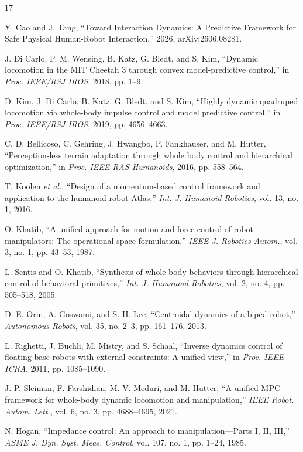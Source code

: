 \documentclass[journal]{IEEEtran}
\theoremstyle{plain}
\theoremstyle{definition}
\theoremstyle{remark}
\begin{document}
\begin{thebibliography}{17}

 Y. Cao and J. Tang, ``Toward Interaction Dynamics: A Predictive Framework for Safe Physical Human-Robot Interaction,'' 2026, arXiv:2606.08281.

 J. Di Carlo, P. M. Wensing, B. Katz, G. Bledt, and S. Kim, ``Dynamic locomotion in the MIT Cheetah 3 through convex model-predictive control,'' in \emph{Proc. IEEE/RSJ IROS}, 2018, pp. 1--9.

 D. Kim, J. Di Carlo, B. Katz, G. Bledt, and S. Kim, ``Highly dynamic quadruped locomotion via whole-body impulse control and model predictive control,'' in \emph{Proc. IEEE/RSJ IROS}, 2019, pp. 4656--4663.

 C. D. Bellicoso, C. Gehring, J. Hwangbo, P. Fankhauser, and M. Hutter, ``Perception-less terrain adaptation through whole body control and hierarchical optimization,'' in \emph{Proc. IEEE-RAS Humanoids}, 2016, pp. 558--564.

 T. Koolen \emph{et al.}, ``Design of a momentum-based control framework and application to the humanoid robot Atlas,'' \emph{Int. J. Humanoid Robotics}, vol. 13, no. 1, 2016.

 O. Khatib, ``A unified approach for motion and force control of robot manipulators: The operational space formulation,'' \emph{IEEE J. Robotics Autom.}, vol. 3, no. 1, pp. 43--53, 1987.

 L. Sentis and O. Khatib, ``Synthesis of whole-body behaviors through hierarchical control of behavioral primitives,'' \emph{Int. J. Humanoid Robotics}, vol. 2, no. 4, pp. 505--518, 2005.

 D. E. Orin, A. Goswami, and S.-H. Lee, ``Centroidal dynamics of a biped robot,'' \emph{Autonomous Robots}, vol. 35, no. 2--3, pp. 161--176, 2013.

 L. Righetti, J. Buchli, M. Mistry, and S. Schaal, ``Inverse dynamics control of floating-base robots with external constraints: A unified view,'' in \emph{Proc. IEEE ICRA}, 2011, pp. 1085--1090.

 J.-P. Sleiman, F. Farshidian, M. V. Meduri, and M. Hutter, ``A unified MPC framework for whole-body dynamic locomotion and manipulation,'' \emph{IEEE Robot. Autom. Lett.}, vol. 6, no. 3, pp. 4688--4695, 2021.

 N. Hogan, ``Impedance control: An approach to manipulation---Parts I, II, III,'' \emph{ASME J. Dyn. Syst. Meas. Control}, vol. 107, no. 1, pp. 1--24, 1985.


\end{thebibliography}
\end{document}
